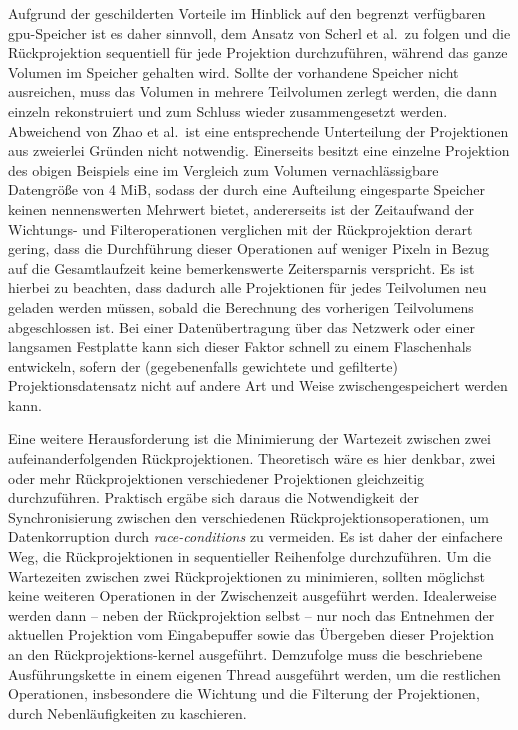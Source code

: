 Aufgrund der geschilderten Vorteile im Hinblick auf den begrenzt verfügbaren \gls{gpu}-Speicher ist es daher sinnvoll,
dem Ansatz von Scherl et al.\ zu folgen und die Rückprojektion sequentiell für jede Projektion durchzuführen, während
das ganze Volumen im Speicher gehalten wird. Sollte der vorhandene Speicher nicht ausreichen, muss das Volumen
in mehrere Teilvolumen zerlegt werden, die dann einzeln rekonstruiert und zum Schluss wieder zusammengesetzt werden.
Abweichend von Zhao et al.\ ist eine entsprechende Unterteilung der Projektionen aus zweierlei Gründen nicht notwendig.
Einerseits besitzt eine einzelne Projektion des obigen Beispiels eine im Vergleich zum Volumen vernachlässigbare
Datengröße von 4 MiB, sodass der durch eine Aufteilung eingesparte Speicher keinen nennenswerten Mehrwert bietet,
andererseits ist der Zeitaufwand der Wichtungs- und Filteroperationen verglichen mit der Rückprojektion derart gering,
dass die Durchführung dieser Operationen auf weniger Pixeln in Bezug auf die Gesamtlaufzeit keine bemerkenswerte
Zeitersparnis verspricht. Es ist hierbei zu beachten, dass dadurch alle Projektionen für jedes Teilvolumen neu geladen
werden müssen, sobald die Berechnung des vorherigen Teilvolumens abgeschlossen ist. Bei einer Datenübertragung über das
Netzwerk oder einer langsamen Festplatte kann sich dieser Faktor schnell zu einem Flaschenhals entwickeln, sofern der
(gegebenenfalls gewichtete und gefilterte) Projektionsdatensatz nicht auf andere Art und Weise zwischengespeichert
werden kann.

Eine weitere Herausforderung ist die Minimierung der Wartezeit zwischen zwei aufeinanderfolgenden Rückprojektionen.
Theoretisch wäre es hier denkbar, zwei oder mehr Rückprojektionen verschiedener Projektionen gleichzeitig durchzuführen.
Praktisch ergäbe sich daraus die Notwendigkeit der Synchronisierung zwischen den verschiedenen
Rückprojektionsoperationen, um Datenkorruption durch \textit{\glspl{race-condition}} zu vermeiden. Es ist daher der
einfachere Weg, die Rückprojektionen in sequentieller Reihenfolge durchzuführen. Um die Wartezeiten zwischen zwei
Rückprojektionen zu minimieren, sollten möglichst keine weiteren Operationen in der Zwischenzeit ausgeführt werden.
Idealerweise werden dann -- neben der Rückprojektion selbst -- nur noch das Entnehmen der aktuellen Projektion vom
Eingabepuffer sowie das Übergeben dieser Projektion an den Rückprojektions-\gls{kernel} ausgeführt. Demzufolge muss die
beschriebene Ausführungskette in einem eigenen Thread ausgeführt werden, um die restlichen Operationen, insbesondere die
Wichtung und die Filterung der Projektionen, durch Nebenläufigkeiten zu kaschieren.

